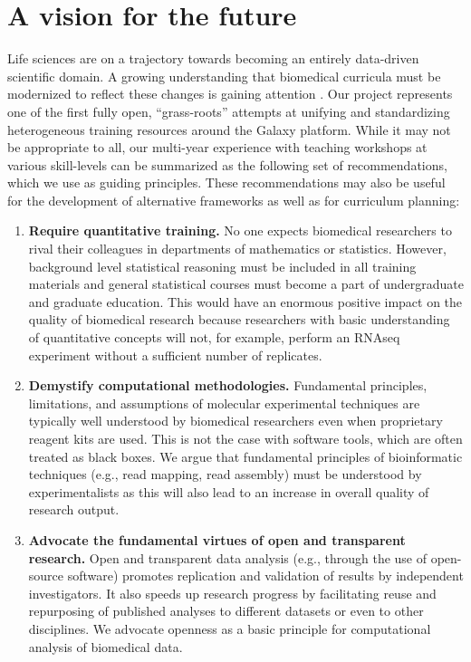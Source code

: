 \section*{A vision for the future}
Life sciences are on a trajectory towards becoming an entirely data-driven scientific domain. A growing understanding that biomedical curricula must be modernized to reflect these changes is gaining attention \cite{10.7554/eLife.32715}. Our project represents one of the first fully open, “grass-roots” attempts at unifying and standardizing heterogeneous training resources around the Galaxy platform. While it may not be appropriate to all, our multi-year experience with teaching workshops at various skill-levels can be summarized as the following set of recommendations, which we use as guiding principles. These recommendations may also be useful for the development of alternative frameworks as well as for curriculum planning:

\begin{enumerate}
\item \textbf{Require quantitative training.} No one expects biomedical researchers to rival their colleagues in departments of mathematics or statistics. However, background level statistical reasoning must be included in all training materials and general statistical courses must become a part of undergraduate and graduate education. This would have an enormous positive impact on the quality of biomedical research because researchers with basic understanding of quantitative concepts will not, for example, perform an RNAseq experiment without a sufficient number of replicates.
\item \textbf{Demystify computational methodologies.} Fundamental principles, limitations, and assumptions of molecular experimental techniques are typically well understood by biomedical researchers even when proprietary reagent kits are used. This is not the case with software tools, which are often treated as black boxes. We argue that fundamental principles of bioinformatic techniques (e.g., read mapping, read assembly) must be understood by experimentalists as this will also lead to an increase in overall quality of research output.
\item \textbf{Advocate the fundamental virtues of open and transparent research.} Open and transparent data analysis (e.g., through the use of open-source software) promotes replication and validation of results by independent investigators. It also speeds up research progress by facilitating reuse and repurposing of published analyses to different datasets or even to other disciplines. We advocate openness as a basic principle for computational analysis of biomedical data.
\end{enumerate}

